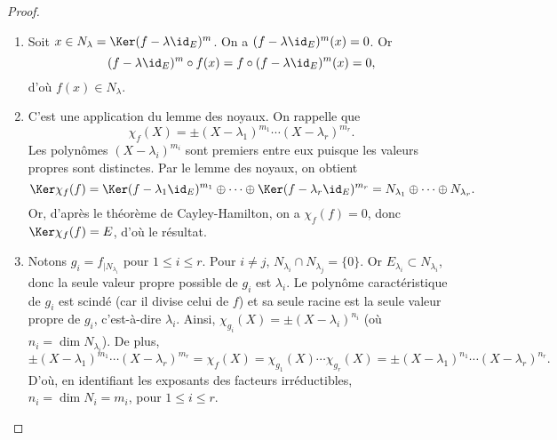 \documentclass[12pt, class=report,crop=false]{standalone}
\begin{document}
\begin{proof}~
\begin{enumerate}
  \item Soit $x \in N_\lambda = \Ker (f-\lambda \id_E)^m$.
  On a $(f-\lambda\id_E)^{m}(x)=0$. Or 
$$(f-\lambda\id_E)^{m}\circ f(x)=f\circ(f-\lambda\id_E)^{m}(x)=0,$$
d'où $f(x)\in N_\lambda$.

  \item C'est une application du lemme des noyaux. On rappelle que
$$\chi_f(X)=\pm(X-\lambda_1)^{m_1}\cdots(X-\lambda_r)^{m_r}.$$
Les polynômes $(X-\lambda_i)^{m_i}$ sont premiers entre eux puisque 
les valeurs propres sont distinctes. Par le lemme des noyaux, on obtient
$$\Ker \chi_f(f) 
= \Ker (f-\lambda_1\id_E)^{m_1} \oplus \cdots \oplus \Ker (f-\lambda_r\id_E)^{m_r}
= N_{\lambda_1} \oplus\cdots\oplus N_{\lambda_r}.$$
Or, d'après le théorème de Cayley-Hamilton, on a $\chi_f(f)=0$, donc $\Ker \chi_f(f)=E$, 
d'où le résultat.
 
  \item Notons $g_i=f_{|N_{\lambda_i}}$ pour $1\le i \le r$. 
  Pour $i\neq j$, $N_{\lambda_i}\cap N_{\lambda_j}=\{0\}$. Or $E_{\lambda_i}\subset N_{\lambda_i}$, 
  donc la seule valeur propre possible de $g_i$ est $\lambda_i$. 
  Le polynôme caractéristique de $g_i$ est scindé (car il divise celui de $f$) et sa seule racine est la seule valeur propre de $g_i$, c'est-à-dire $\lambda_i$. 
  Ainsi, $\chi_{g_i}(X)= \pm(X-\lambda_i)^{n_i}$ (où $n_i = \dim N_{\lambda_i}$). 
  De plus,
$$\pm(X-\lambda_1)^{m_1}\cdots(X-\lambda_r)^{m_r} = \chi_f(X) 
= \chi_{g_1}(X)\cdots \chi_{g_r}(X) = \pm (X-\lambda_1)^{n_1}\cdots(X-\lambda_r)^{n_r}.$$
D'où, en identifiant les exposants des facteurs irréductibles, $n_i=\dim N_i=m_i$, pour $1\le i\le r$.
\end{enumerate}
\end{proof}
\end{document}
